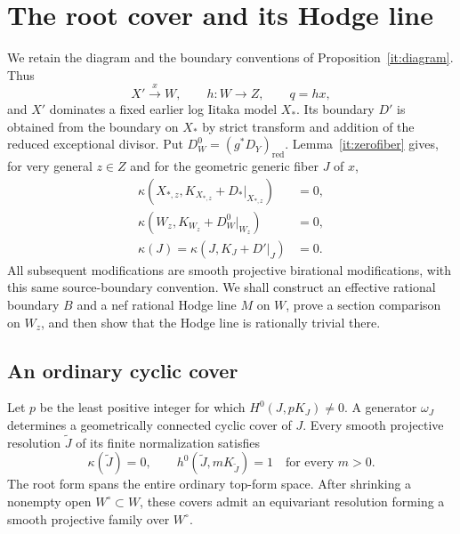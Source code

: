 \section{The root cover and its Hodge line}
\label{sec:rankone}\label{hd:section}

We retain the diagram and the boundary conventions of
Proposition~\ref{it:diagram}.  Thus
\[
 X'\xrightarrow{x}W,\qquad h:W\longrightarrow Z,
 \qquad q=hx,
\]
and $X'$ dominates a fixed earlier log Iitaka model $X_*$.  Its boundary
$D'$ is obtained from the boundary on $X_*$ by strict transform and addition
of the reduced exceptional divisor.  Put
$D_W^0=(g^*D_Y)_{\mathrm{red}}$.  Lemma~\ref{it:zerofiber} gives, for very
general $z\in Z$ and for the geometric generic fiber $J$ of $x$,
\begin{equation}
 \begin{split}
 \kappa(X_{*,z},K_{X_{*,z}}+D_*|_{X_{*,z}})&=0,\\
 \kappa(W_z,K_{W_z}+D_W^0|_{W_z})&=0,\\
 \kappa(J)=\kappa(J,K_J+D'|_J)&=0.
 \end{split}
 \label{ro:initial-zero}
\end{equation}
All subsequent modifications are smooth projective birational
modifications, with this same source-boundary convention.  We shall
construct an effective rational boundary $B$ and a nef rational Hodge line
$M$ on $W$, prove a section comparison on $W_z$, and then show that the
Hodge line is rationally trivial there.

\subsection{An ordinary cyclic cover}

\begin{lemma}
\label{ro:root}
Let $p$ be the least positive integer for which
$H^0(J,pK_J)\ne0$.  A generator $\omega_J$ determines a geometrically
connected cyclic cover of $J$.  Every smooth projective resolution
$\widetilde J$ of its finite normalization satisfies
\[
 \kappa(\widetilde J)=0,
 \qquad h^0(\widetilde J,mK_{\widetilde J})=1
 \quad\text{for every }m>0.
\]
The root form spans the entire ordinary top-form space.  After shrinking
a nonempty open $W^\circ\subset W$, these covers admit an equivariant
resolution forming a smooth projective family over $W^\circ$.
\end{lemma}


